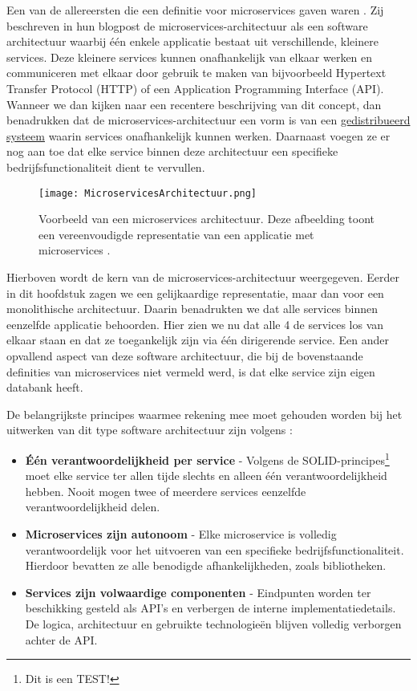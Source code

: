 Een van de allereersten die een definitie voor microservices gaven waren \textcite{Lewis2014}. Zij beschreven in hun blogpost de microservices-architectuur als een software architectuur waarbij één enkele applicatie bestaat uit verschillende, kleinere services. Deze kleinere services kunnen onafhankelijk van elkaar werken en communiceren met elkaar door gebruik te maken van bijvoorbeeld Hypertext Transfer Protocol (HTTP) of een Application Programming Interface (API). Wanneer we dan kijken naar een recentere beschrijving van dit concept, dan benadrukken \textcite{Velepucha2023} dat de microservices-architectuur een vorm is van een \hyperref[sec:distributed systems]{gedistribueerd systeem} waarin services onafhankelijk kunnen werken. Daarnaast voegen ze er nog aan toe dat elke service binnen deze architectuur een specifieke bedrijfsfunctionaliteit dient te vervullen.

\begin{figure}[H]
	\centering
	\texttt{[image: MicroservicesArchitectuur.png]}
	\caption[Voorstelling van een microservices architectuur]{\label{fig:microservices architectuur}Voorbeeld van een microservices architectuur. Deze afbeelding toont een vereenvoudigde representatie van een applicatie met microservices \autocite{Gos2020}.}
\end{figure}

Hierboven wordt de kern van de microservices-architectuur weergegeven. Eerder in dit hoofdstuk zagen we een gelijkaardige representatie, maar dan voor een monolithische architectuur. Daarin benadrukten we dat alle services binnen eenzelfde applicatie behoorden. Hier zien we nu dat alle 4 de services los van elkaar staan en dat ze toegankelijk zijn via één dirigerende service. Een ander opvallend aspect van deze software architectuur, die bij de bovenstaande definities van microservices niet vermeld werd, is dat elke service zijn eigen databank heeft.\newline

De belangrijkste principes waarmee rekening mee moet gehouden worden bij het uitwerken van dit type software architectuur zijn volgens \textcite{Blinowski2022}:

\begin{itemize}
	\item \textbf{Één verantwoordelijkheid per service} - Volgens de SOLID-principes\footnote{Dit is een TEST!} moet elke service ter allen tijde slechts en alleen één verantwoordelijkheid hebben. Nooit mogen twee of meerdere services eenzelfde verantwoordelijkheid delen.
	\item \textbf{Microservices zijn autonoom} - Elke microservice is volledig verantwoordelijk voor het uitvoeren van een specifieke bedrijfsfunctionaliteit. Hierdoor bevatten ze alle benodigde afhankelijkheden, zoals bibliotheken.
	\item \textbf{Services zijn volwaardige componenten} - Eindpunten worden ter beschikking gesteld als API's en verbergen de interne implementatiedetails. De logica, architectuur en gebruikte technologieën blijven volledig verborgen achter de API.
\end{itemize}

